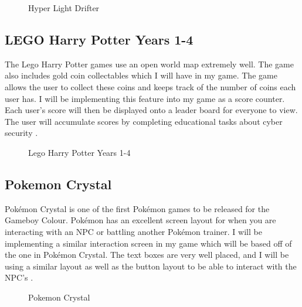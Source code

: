 \documentclass[12pt]{report}
\begin{document}
\begin{figure}[H]
    \centering
    \caption{Hyper Light Drifter \cite{hyperL}}
\end{figure}

\pagebreak

\subsection{LEGO Harry Potter Years 1-4}
The Lego Harry Potter games use an open world map extremely well. The game also includes gold coin collectables which I will have in my game. The game allows the user to collect these coins and keeps track of the number of coins each user has. I will be implementing this feature into my game as a score counter. Each user’s score will then be displayed onto a leader board for everyone to view. The user will accumulate scores by completing educational tasks about cyber security \cite{harryP}. 

\begin{figure}[h]
     \centering
    \caption{Lego Harry Potter Years 1-4 \cite{harryP}}
\end{figure}

\subsection{Pokemon Crystal}
Pokémon Crystal is one of the first Pokémon games to be released for the Gameboy Colour. Pokémon has an excellent screen layout for when you are interacting with an NPC or battling another Pokémon trainer. I will be implementing a similar interaction screen in my game which will be based off of the one in Pokémon Crystal. The text boxes are very well placed, and I will be using a similar layout as well as the button layout to be able to interact with the NPC’s \cite{pokemonC}.

\begin{figure}[H]
     \centering
    \caption{Pokemon Crystal \cite{pokemonC}}
\end{figure}
\end{document}
